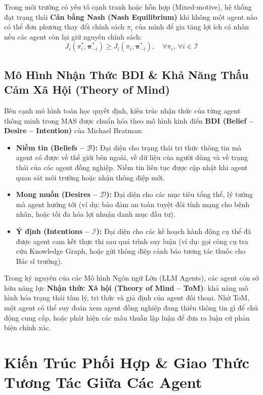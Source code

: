 \documentclass[12pt,a4paper]{report}
\begin{document}
Trong môi trường có yếu tố cạnh tranh hoặc hỗn hợp (Mixed-motive), hệ thống đạt trạng thái \textbf{Cân bằng Nash (Nash Equilibrium)} khi không một agent nào có thể đơn phương thay đổi chính sách $\pi_i$ của mình để gia tăng lợi ích cá nhân nếu các agent còn lại giữ nguyên chính sách:
\begin{equation}
    J_i(\pi_i^*, \boldsymbol{\pi}_{-i}^*) \ge J_i(\pi_i, \boldsymbol{\pi}_{-i}^*), \quad \forall \pi_i, \ \forall i \in \mathcal{I}
\end{equation}

\subsection{Mô Hình Nhận Thức BDI \& Khả Năng Thấu Cảm Xã Hội (Theory of Mind)}
Bên cạnh mô hình toán học quyết định, kiến trúc nhận thức của từng agent thông minh trong MAS được chuẩn hóa theo mô hình kinh điển \textbf{BDI (Belief -- Desire -- Intention)} của Michael Bratman:
\begin{itemize}[leftmargin=1.2cm]
    \item \textbf{Niềm tin (Beliefs -- $\mathcal{B}$):} Đại diện cho trạng thái tri thức thông tin mà agent có được về thế giới bên ngoài, về dữ liệu của người dùng và về trạng thái của các agent đồng nghiệp. Niềm tin liên tục được cập nhật khi agent quan sát môi trường hoặc nhận thông điệp mới.
    \item \textbf{Mong muốn (Desires -- $\mathcal{D}$):} Đại diện cho các mục tiêu tổng thể, lý tưởng mà agent hướng tới (ví dụ: bảo đảm an toàn tuyệt đối tính mạng cho bệnh nhân, hoặc tối đa hóa lợi nhuận danh mục đầu tư).
    \item \textbf{Ý định (Intentions -- $\mathcal{I}$):} Đại diện cho các kế hoạch hành động cụ thể đã được agent cam kết thực thi sau quá trình suy luận (ví dụ: gọi công cụ tra cứu Knowledge Graph, hoặc gửi thông điệp cảnh báo tương tác thuốc cho Bác sĩ trưởng).
\end{itemize}

Trong kỷ nguyên của các Mô hình Ngôn ngữ Lớn (LLM Agents), các agent còn sở hữu năng lực \textbf{Nhận thức Xã hội (Theory of Mind -- ToM)}: khả năng mô hình hóa trạng thái tâm lý, tri thức và giả định của agent đối thoại. Nhờ ToM, một agent có thể suy đoán xem agent đồng nghiệp đang thiếu thông tin gì để chủ động cung cấp, hoặc phát hiện các mâu thuẫn lập luận để đưa ra luận cứ phản biện chính xác.

\section{Kiến Trúc Phối Hợp \& Giao Thức Tương Tác Giữa Các Agent}
\end{document}
